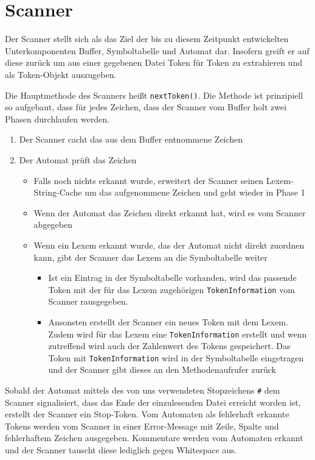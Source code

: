 \documentclass[a4paper,11pt]{report}
\begin{document}
\section{Scanner}
Der Scanner stellt sich als das Ziel der bis zu diesem Zeitpunkt entwickelten Unterkomponenten Buffer, Symboltabelle und Automat dar.
Insofern greift er auf diese zurück um aus einer gegebenen Datei Token für Token zu extrahieren und als Token-Objekt auszugeben.

Die Hauptmethode des Scanners heißt \texttt{nextToken()}.
Die Methode ist prinzipiell so aufgebaut, dass für jedes Zeichen, dass der Scanner vom Buffer holt zwei Phasen durchlaufen werden.

\begin{enumerate}
	\item Der Scanner cacht das aus dem Buffer entnommene Zeichen
	\item Der Automat prüft das Zeichen
	\begin{itemize}
		\item Falls noch nichts erkannt wurde, erweitert der Scanner seinen Lexem-String-Cache um das aufgenommene Zeichen und geht wieder in Phase 1
		\item Wenn der Automat das Zeichen direkt erkannt hat, wird es vom Scanner abgegeben
		\item Wenn ein Lexem erkannt wurde, das der Automat nicht direkt zuordnen kann, gibt der Scanner das Lexem an die Symboltabelle weiter
		\begin{itemize}
			\item Ist ein Eintrag in der Symboltabelle vorhanden, wird das passende Token mit der für das Lexem zugehörigen \texttt{Token\-In\-formation} vom Scanner rausgegeben.
			\item Ansonsten erstellt der Scanner ein neues Token mit dem Lexem. Zudem wird für das Lexem eine \texttt{TokenInformation} erstellt und wenn zutreffend wird auch der Zahlenwert des Tokens gespeichert.
			Das Token mit \texttt{TokenInformation} wird in der Symboltabelle eingetragen und der Scanner gibt dieses an den Methodenaufrufer zurück
		\end{itemize}
	\end{itemize}
\end{enumerate}

Sobald der Automat mittels des von uns verwendeten Stopzeichens \texttt{\#} dem Scanner signalisiert, dass das Ende der einzulesenden Datei erreicht worden ist, erstellt der Scanner ein Stop-Token.
Vom Automaten als fehlerhaft erkannte Tokens werden vom Scanner in einer Error-Message mit Zeile, Spalte und fehlerhaftem Zeichen ausgegeben.
Kommentare werden vom Automaten erkannt und der Scanner tauscht diese lediglich gegen Whitespace aus.
\end{document}
